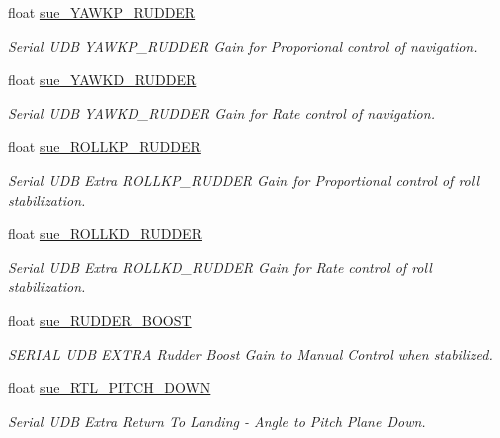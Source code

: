 \begin{DoxyCompactItemize}
\item 
float \hyperlink{struct____mavlink__serial__udb__extra__f7__t_ab5c2a16ffdad061b0d3aed30683b714d}{sue\+\_\+\+Y\+A\+W\+K\+P\+\_\+\+R\+U\+D\+D\+E\+R}
\begin{DoxyCompactList}\small\item\em Serial U\+D\+B Y\+A\+W\+K\+P\+\_\+\+R\+U\+D\+D\+E\+R Gain for Proporional control of navigation. \end{DoxyCompactList}\item 
float \hyperlink{struct____mavlink__serial__udb__extra__f7__t_a96d3ced36cc13148d218ced6828fc835}{sue\+\_\+\+Y\+A\+W\+K\+D\+\_\+\+R\+U\+D\+D\+E\+R}
\begin{DoxyCompactList}\small\item\em Serial U\+D\+B Y\+A\+W\+K\+D\+\_\+\+R\+U\+D\+D\+E\+R Gain for Rate control of navigation. \end{DoxyCompactList}\item 
float \hyperlink{struct____mavlink__serial__udb__extra__f7__t_a7fa95bc6021a13af887ae1ab42f037a1}{sue\+\_\+\+R\+O\+L\+L\+K\+P\+\_\+\+R\+U\+D\+D\+E\+R}
\begin{DoxyCompactList}\small\item\em Serial U\+D\+B Extra R\+O\+L\+L\+K\+P\+\_\+\+R\+U\+D\+D\+E\+R Gain for Proportional control of roll stabilization. \end{DoxyCompactList}\item 
float \hyperlink{struct____mavlink__serial__udb__extra__f7__t_afe7c25c1ec006449d8937e58eb7f984a}{sue\+\_\+\+R\+O\+L\+L\+K\+D\+\_\+\+R\+U\+D\+D\+E\+R}
\begin{DoxyCompactList}\small\item\em Serial U\+D\+B Extra R\+O\+L\+L\+K\+D\+\_\+\+R\+U\+D\+D\+E\+R Gain for Rate control of roll stabilization. \end{DoxyCompactList}\item 
float \hyperlink{struct____mavlink__serial__udb__extra__f7__t_aec0530806190a288e442799983ff5411}{sue\+\_\+\+R\+U\+D\+D\+E\+R\+\_\+\+B\+O\+O\+S\+T}
\begin{DoxyCompactList}\small\item\em S\+E\+R\+I\+A\+L U\+D\+B E\+X\+T\+R\+A Rudder Boost Gain to Manual Control when stabilized. \end{DoxyCompactList}\item 
float \hyperlink{struct____mavlink__serial__udb__extra__f7__t_a6388839dcefbc883fa94a1d80f6d6546}{sue\+\_\+\+R\+T\+L\+\_\+\+P\+I\+T\+C\+H\+\_\+\+D\+O\+W\+N}
\begin{DoxyCompactList}\small\item\em Serial U\+D\+B Extra Return To Landing -\/ Angle to Pitch Plane Down. \end{DoxyCompactList}\end{DoxyCompactItemize}


